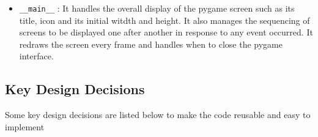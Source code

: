 \documentclass[12pt, a4paper]{article}
\begin{document}
\begin{itemize}
{    In addition to the main functions, there are many helping functions which ease the coding part and shortens the code such as \texttt{draw\_hbar(), glow\_text(),\\ draw\_corner\_brackets() and draw\_gauge()}
    }
    \item{\texttt{\_\_main\_\_} :
    It handles the overall display of the pygame screen such as its title, icon and its initial witdth and height. It also manages the sequencing of screens to be displayed one after another in response to any event occurred. It redraws the screen every frame and handles when to close the pygame interface.
    }
   
\end{itemize}


\subsection{Key Design Decisions}
Some key design decisions are listed below to make the code reusable and easy to implement
\end{document}
